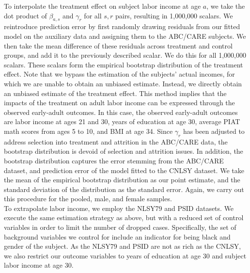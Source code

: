 \noindent To interpolate the treatment effect on subject labor income at age $a$, we take the dot product
of $\beta_{a, s}$ and $\gamma_r$ for all $s,r$ pairs, resulting in 1,000,000 scalars. We reintroduce
prediction error by first randomly drawing residuals from our fitted model on the auxiliary data and assigning
them to the ABC/CARE subjects. We then take the mean difference of these residuals across treatment and control
groups, and add it to the previously described scalar. We do this for all 1,000,000 scalars. These scalars form the empirical
bootstrap distribution of the treatment effect. Note that
we bypass the estimation of the subjects' actual incomes, for which we are unable to obtain an
unbiased estimate. Instead, we directly obtain an unbiased estimate of the treatment effect. This
method implies that the impacts of the treatment on adult labor income can be expressed through
the observed early-adult outcomes. In this case, the observed early-adult outcomes are labor income at ages 21 and
30, years of education at age 30, average PIAT math scores from ages 5 to 10, and BMI at age 34. Since $\gamma_r$ has
been adjusted to address selection into treatment and attrition in the ABC/CARE data, the bootstrap distribution
is devoid of selection and attrition issues. In addition, the bootstrap distribution captures
the error stemming from the ABC/CARE dataset, and prediction error of the model fitted to the CNLSY dataset.
We take the mean of the empirical bootstrap distribution as our point estimate, and the standard deviation
of the distribution as the standard error. Again, we carry out this procedure for the
pooled, male, and female samples. \\

\noindent To extrapolate labor income, we employ the NLSY79 and PSID datasets. We execute the same estimation
strategy as above, but with a reduced set of control variables in order to limit the number
of dropped cases. Specifically, the set of background variables we control for include an indicator for
being black and gender of the subject. As the NLSY79 and PSID are not as rich as the CNLSY, we also
restrict our outcome variables to years of education at age 30 and subject labor income at age 30. \\

